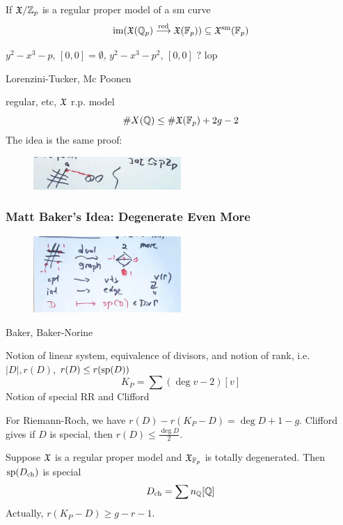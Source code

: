 If $\fX/\Z_p$ is a regular proper model of a sm curve
	\[
	\im( \fX(\Qp) \ma{\text{red}} \fX(\F_p) ) \subseteq \fX^{\text{sm}}(\F_p)
	\]


\begin{ex}
$y^2 - x^3 - p$, $[0,0]= \emptyset$, $y^2 - x^3 - p^2$, $[0,0]$ ? lop

Lorenzini-Tucker, Mc Poonen

regular, etc, $\fX$ r.p. model
	\[
	\#X(\Q) \leq \#\fX(\F_p) + 2g-2
	\]
The idea is the same proof:

	\begin{figure}[!ht]
	\centering
	\includegraphics[width=0.5\textwidth]{../images/im22.png}
	\end{figure}
\end{ex}




\subsubsection{Matt Baker's Idea: Degenerate Even More}


	\begin{figure}[!ht]
	\centering
	\includegraphics[width=0.5\textwidth]{../images/im23.png}
	\end{figure}



Baker, Baker-Norine

Notion of linear system, equivalence of divisors, and notion of rank, i.e. $|D|, r(D)$, $r(D) \leq r(\sp(D))$
	\[
	K_P= \sum (\deg v - 2)[v]
	\]
Notion of special RR and Clifford 


For Riemann-Roch, we have $r(D) - r(K_P - D)= \deg D + 1 - g$. Clifford gives if $D$ is special, then $r(D) \leq \frac{\deg D}{2}$. 


\begin{thm}[Katz,ZB]
Suppose $\fX$ is a regular proper model and $\fX_{\F_p}$ is totally degenerated. Then $\sp(D_{\text{ch}})$ is special
	\[
	D_{\text{ch}}= \sum n_\Q[\Q]
	\]
Actually, $r(K_P - D) \geq g - r - 1$.
\end{thm}

